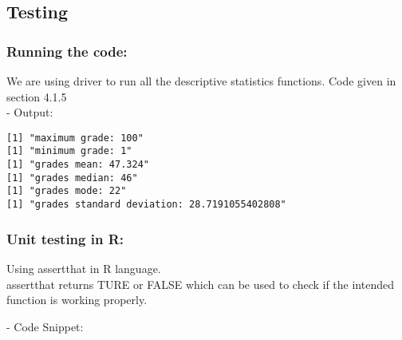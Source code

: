 \documentclass[11pt]{article}
\begin{document}
\subsection{Testing}

\subsubsection{Running the code:}

We are using driver to run all the descriptive statistics functions. Code given in section 4.1.5\\

- Output:

\begin{lstlisting}
[1] "maximum grade: 100"
[1] "minimum grade: 1"
[1] "grades mean: 47.324"
[1] "grades median: 46"
[1] "grades mode: 22"
[1] "grades standard deviation: 28.7191055402808"
\end{lstlisting}

\subsubsection{Unit testing in R:}

Using assertthat in R language.\\

assertthat returns TURE or FALSE which can be used to check if the intended function is working properly.

- Code Snippet:\\
\end{document}
